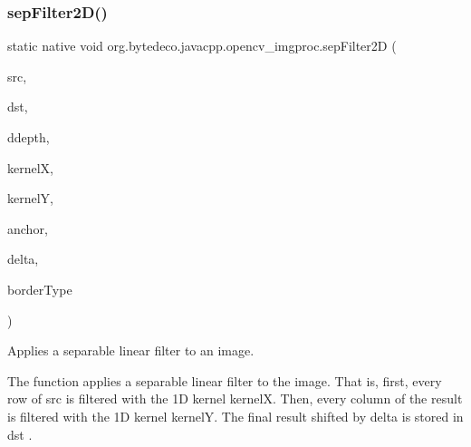 \subsubsection{\texorpdfstring{sep\+Filter2\+D()}{sepFilter2D()}}
{\footnotesize\ttfamily static native void org.\+bytedeco.\+javacpp.\+opencv\+\_\+imgproc.\+sep\+Filter2D (\begin{DoxyParamCaption}\item[{@By\+Val Mat}]{src,  }\item[{@By\+Val Mat}]{dst,  }\item[{int}]{ddepth,  }\item[{@By\+Val Mat}]{kernelX,  }\item[{@By\+Val Mat}]{kernelY,  }\item[{@By\+Val(null\+Value=\char`\"{}cv\+::\+Point(-\/1,-\/1)\char`\"{}) Point}]{anchor,  }\item[{double}]{delta,  }\item[{int}]{border\+Type }\end{DoxyParamCaption})\hspace{0.3cm}{\ttfamily [static]}}



Applies a separable linear filter to an image. 

The function applies a separable linear filter to the image. That is, first, every row of src is filtered with the 1D kernel kernelX. Then, every column of the result is filtered with the 1D kernel kernelY. The final result shifted by delta is stored in dst . 


